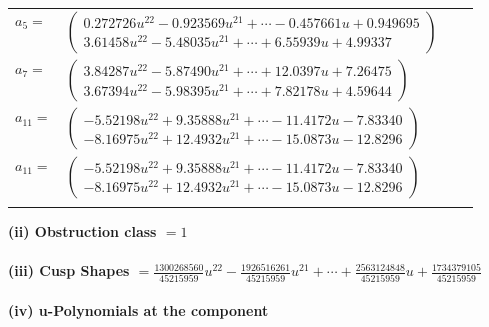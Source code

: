 \documentclass[1p]{elsarticle_modified}
\theoremstyle{definition}
\begin{document}
\begin{tabular}{m{7pt} m{180pt} m{7pt} m{180pt} }
\flushright $a_{5}=$&$\begin{pmatrix}0.272726 u^{22}-0.923569 u^{21}+\cdots-0.457661 u+0.949695\\3.61458 u^{22}-5.48035 u^{21}+\cdots+6.55939 u+4.99337\end{pmatrix}$ \\
\flushright $a_{7}=$&$\begin{pmatrix}3.84287 u^{22}-5.87490 u^{21}+\cdots+12.0397 u+7.26475\\3.67394 u^{22}-5.98395 u^{21}+\cdots+7.82178 u+4.59644\end{pmatrix}$ \\
\flushright $a_{11}=$&$\begin{pmatrix}-5.52198 u^{22}+9.35888 u^{21}+\cdots-11.4172 u-7.83340\\-8.16975 u^{22}+12.4932 u^{21}+\cdots-15.0873 u-12.8296\end{pmatrix}$\\ \flushright $a_{11}=$&$\begin{pmatrix}-5.52198 u^{22}+9.35888 u^{21}+\cdots-11.4172 u-7.83340\\-8.16975 u^{22}+12.4932 u^{21}+\cdots-15.0873 u-12.8296\end{pmatrix}$\\&\end{tabular}
\flushleft \textbf{(ii) Obstruction class $= 1$}\\~\\
\flushleft \textbf{(iii) Cusp Shapes $= \frac{1300268560}{45215959} u^{22}-\frac{1926516261}{45215959} u^{21}+\cdots+\frac{2563124848}{45215959} u+\frac{1734379105}{45215959}$}\\~\\
\newpage\renewcommand{\arraystretch}{1}
\flushleft \textbf{(iv) u-Polynomials at the component}\newline \\
\end{document}
